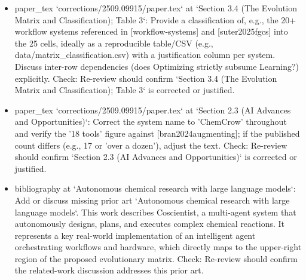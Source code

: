 \documentclass[11pt]{article}
\begin{document}
\begin{itemize}[leftmargin=*]
  \item [open] paper\_tex `corrections/2509.09915/paper.tex` at `Section 3.4 (The Evolution Matrix and Classification); Table 3`: Provide a classification of, e.g., the 20+ workflow systems referenced in [workflow-systems] and [suter2025fgcs] into the 25 cells, ideally as a reproducible table/CSV (e.g., data/matrix\_classification.csv) with a justification column per system. Discuss inter-row dependencies (does Optimizing strictly subsume Learning?) explicitly. Check: Re-review should confirm `Section 3.4 (The Evolution Matrix and Classification); Table 3` is corrected or justified.
  \item [open] paper\_tex `corrections/2509.09915/paper.tex` at `Section 2.3 (AI Advances and Opportunities)`: Correct the system name to 'ChemCrow' throughout and verify the '18 tools' figure against [bran2024augmenting]; if the published count differs (e.g., 17 or 'over a dozen'), adjust the text. Check: Re-review should confirm `Section 2.3 (AI Advances and Opportunities)` is corrected or justified.
  \item [open] bibliography at `Autonomous chemical research with large language models`: Add or discuss missing prior art `Autonomous chemical research with large language models`. This work describes Coscientist, a multi-agent system that autonomously designs, plans, and executes complex chemical reactions. It represents a key real-world implementation of an intelligent agent orchestrating workflows and hardware, which directly maps to the upper-right region of the proposed evolutionary matrix. Check: Re-review should confirm the related-work discussion addresses this prior art.
\end{itemize}
\end{document}
